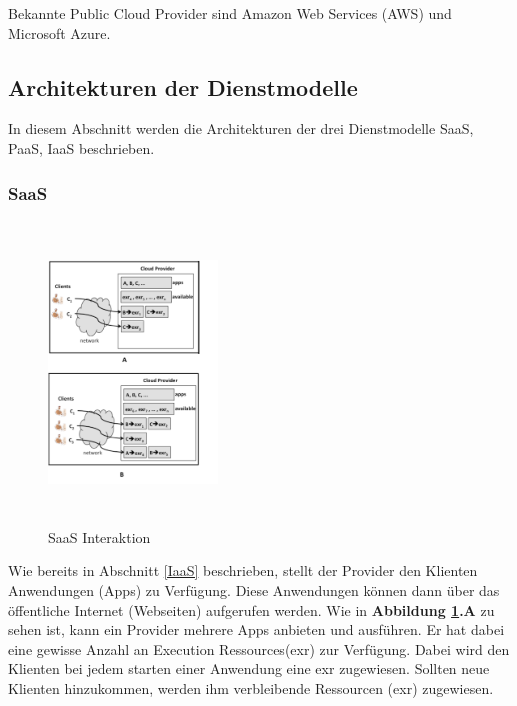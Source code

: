 Bekannte Public Cloud Provider sind Amazon Web Services (AWS) und Microsoft Azure. 



\subsection{Architekturen der Dienstmodelle}

In diesem Abschnitt werden die Architekturen der drei Dienstmodelle SaaS, PaaS, IaaS beschrieben.

\subsubsection{SaaS}\label{SaaS Architektur}

\begin{figure}[H]
    \centering
	\includegraphics[width=0.4\textwidth, height=8cm]{Images/SaaSInteraction}
	\caption{SaaS Interaktion \cite{Badger}}
	\label{SaaSInteraction}
\end{figure}
Wie bereits in Abschnitt \ref{IaaS} beschrieben, stellt der Provider den Klienten Anwendungen (\glqq Apps\grqq) zu Verfügung.
Diese Anwendungen können dann über das öffentliche Internet (Webseiten) aufgerufen werden.
Wie in \textbf{Abbildung \ref{SaaSInteraction}.A} zu sehen ist, kann ein Provider mehrere Apps anbieten und ausführen.
Er hat dabei eine gewisse Anzahl an \glqq Execution Ressources\grqq (exr) zur Verfügung. 
Dabei wird den Klienten bei jedem starten einer Anwendung eine exr zugewiesen. Sollten neue Klienten hinzukommen, werden ihm verbleibende Ressourcen (exr) zugewiesen. 

